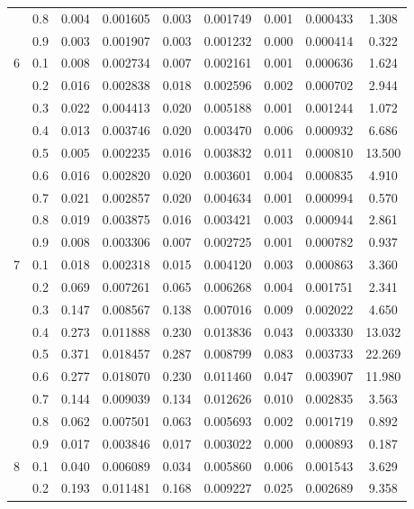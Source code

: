\begin{longtable}{ | c | c || c | c | c | c | c | c | c | }
 & 0.8 & 0.004 & 0.001605 & 0.003 & 0.001749 & 0.001 & 0.000433 & 1.308 \\
 & 0.9 & 0.003 & 0.001907 & 0.003 & 0.001232 & 0.000 & 0.000414 & 0.322 \\
 \hline
\multirow{9}{*}{6} & 0.1 & 0.008 & 0.002734 & 0.007 & 0.002161 & 0.001 & 0.000636 & 1.624 \\
 & 0.2 & 0.016 & 0.002838 & 0.018 & 0.002596 & 0.002 & 0.000702 & 2.944 \\
 & 0.3 & 0.022 & 0.004413 & 0.020 & 0.005188 & 0.001 & 0.001244 & 1.072 \\
 & 0.4 & 0.013 & 0.003746 & 0.020 & 0.003470 & 0.006 & 0.000932 & 6.686 \\
 & 0.5 & 0.005 & 0.002235 & 0.016 & 0.003832 & 0.011 & 0.000810 & 13.500 \\
 & 0.6 & 0.016 & 0.002820 & 0.020 & 0.003601 & 0.004 & 0.000835 & 4.910 \\
 & 0.7 & 0.021 & 0.002857 & 0.020 & 0.004634 & 0.001 & 0.000994 & 0.570 \\
 & 0.8 & 0.019 & 0.003875 & 0.016 & 0.003421 & 0.003 & 0.000944 & 2.861 \\
 & 0.9 & 0.008 & 0.003306 & 0.007 & 0.002725 & 0.001 & 0.000782 & 0.937 \\
 \hline
\multirow{9}{*}{7} & 0.1 & 0.018 & 0.002318 & 0.015 & 0.004120 & 0.003 & 0.000863 & 3.360 \\
 & 0.2 & 0.069 & 0.007261 & 0.065 & 0.006268 & 0.004 & 0.001751 & 2.341 \\
 & 0.3 & 0.147 & 0.008567 & 0.138 & 0.007016 & 0.009 & 0.002022 & 4.650 \\
 & 0.4 & 0.273 & 0.011888 & 0.230 & 0.013836 & 0.043 & 0.003330 & 13.032 \\
 & 0.5 & 0.371 & 0.018457 & 0.287 & 0.008799 & 0.083 & 0.003733 & 22.269 \\
 & 0.6 & 0.277 & 0.018070 & 0.230 & 0.011460 & 0.047 & 0.003907 & 11.980 \\
 & 0.7 & 0.144 & 0.009039 & 0.134 & 0.012626 & 0.010 & 0.002835 & 3.563 \\
 & 0.8 & 0.062 & 0.007501 & 0.063 & 0.005693 & 0.002 & 0.001719 & 0.892 \\
 & 0.9 & 0.017 & 0.003846 & 0.017 & 0.003022 & 0.000 & 0.000893 & 0.187 \\
 \hline
\multirow{9}{*}{8} & 0.1 & 0.040 & 0.006089 & 0.034 & 0.005860 & 0.006 & 0.001543 & 3.629 \\
 & 0.2 & 0.193 & 0.011481 & 0.168 & 0.009227 & 0.025 & 0.002689 & 9.358 \\

\end{longtable}
